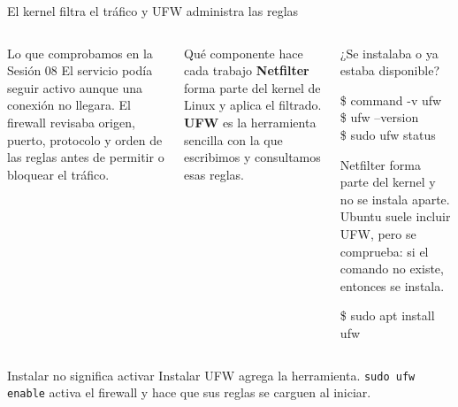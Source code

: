 \documentclass[aspectratio=169,10pt,c]{beamer}
\begin{document}
\begin{frame}{El kernel filtra el tráfico y UFW administra las reglas}
\begin{columns}[T,onlytextwidth]
\begin{block}{Lo que comprobamos en la Sesión 08}
\small El servicio podía seguir activo aunque una conexión no llegara. El firewall revisaba origen, puerto, protocolo y orden de las reglas antes de permitir o bloquear el tráfico.
\end{block}
\begin{exampleblock}{Qué componente hace cada trabajo}
\small \textbf{Netfilter} forma parte del kernel de Linux y aplica el filtrado. \textbf{UFW} es la herramienta sencilla con la que escribimos y consultamos esas reglas.
\end{exampleblock}
\begin{exampleblock}{¿Se instalaba o ya estaba disponible?}
\begin{terminal}\footnotesize
\$ command -v ufw\\
\$ ufw --version\\
\$ sudo ufw status
\end{terminal}
\small Netfilter forma parte del kernel y no se instala aparte. Ubuntu suele incluir UFW, pero se comprueba: si el comando no existe, entonces se instala.
\begin{terminal}\footnotesize
\$ sudo apt install ufw
\end{terminal}
\end{exampleblock}
\end{columns}
\begin{alertblock}{Instalar no significa activar}
\small Instalar UFW agrega la herramienta. \texttt{sudo ufw enable} activa el firewall y hace que sus reglas se carguen al iniciar.
\end{alertblock}
\end{frame}
\end{document}
